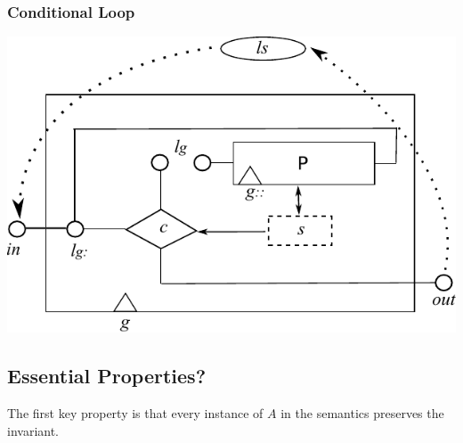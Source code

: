 \newpage
\subsubsection{Conditional Loop}



\includegraphics{images/iteration-actual}

\newpage
\subsection{Essential Properties?}

The first key property is that every instance of $A$
in the semantics preserves the invariant.

